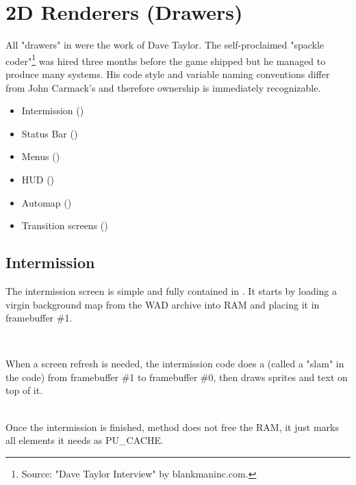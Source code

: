 
\section{2D Renderers (Drawers)}
All "drawers" in \doom{} were the work of Dave Taylor. The self-proclaimed "spackle coder"\footnote{Source: "Dave Taylor Interview" by blankmaninc.com.} was hired three months before the game shipped but he managed to produce many systems. His code style and variable naming conventions differ from John Carmack's and therefore ownership is immediately recognizable.
\begin{itemize}
\item Intermission ()
\item Status Bar ()
\item Menus ()
\item HUD ()
\item Automap ()
\item Transition screens ()
\end{itemize} 
\par




\subsection{Intermission}
The intermission screen is simple and fully contained in . It starts by loading a virgin background map from the WAD archive into RAM and placing it in framebuffer \#1.\\
\par
{}\\
\par
When a screen refresh is needed, the intermission code does a  (called a "slam" in the code) from framebuffer \#1 to framebuffer \#0, then draws sprites and text on top of it.\\
\par
{}\\

Once the intermission is finished, method  does not free the RAM, it just marks all elements it needs as PU\_CACHE.\\





